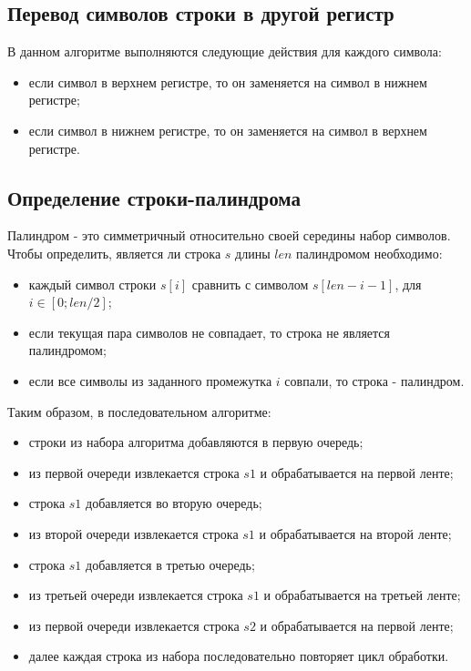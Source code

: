 \subsection{Перевод символов строки в другой регистр}

В данном алгоритме выполняются следующие действия для каждого символа:

\begin{itemize}
	\item если символ в верхнем регистре, то он заменяется на символ в нижнем регистре;
	\item если символ в нижнем регистре, то он заменяется на символ в верхнем регистре.
\end{itemize}

\subsection{Определение строки-палиндрома}

Палиндром - это симметричный относительно своей середины набор символов. Чтобы определить, является ли строка $s$ длины $len$ палиндромом необходимо:

\begin{itemize}
	\item каждый символ строки $s[i]$ сравнить с символом $s[len - i - 1]$,  для $i \in [0;len/2]$;
	\item если текущая пара символов не совпадает, то строка не является палиндромом;
	\item если все символы из заданного промежутка $i$ совпали, то строка - палиндром.
\end{itemize}

Таким образом, в последовательном алгоритме:
\begin{itemize}
	\item строки из набора алгоритма добавляются в первую очередь;
	\item из первой очереди извлекается строка $s1$ и обрабатывается на первой ленте;
	\item строка $s1$ добавляется во вторую очередь;
	\item из второй очереди извлекается строка $s1$ и обрабатывается на второй ленте;
	\item строка $s1$ добавляется в третью очередь;
	\item из третьей очереди извлекается строка $s1$ и обрабатывается на третьей ленте;
	\item из первой очереди извлекается строка $s2$ и обрабатывается на первой ленте;
	\item далее каждая строка из набора последовательно повторяет цикл обработки.
\end{itemize}

